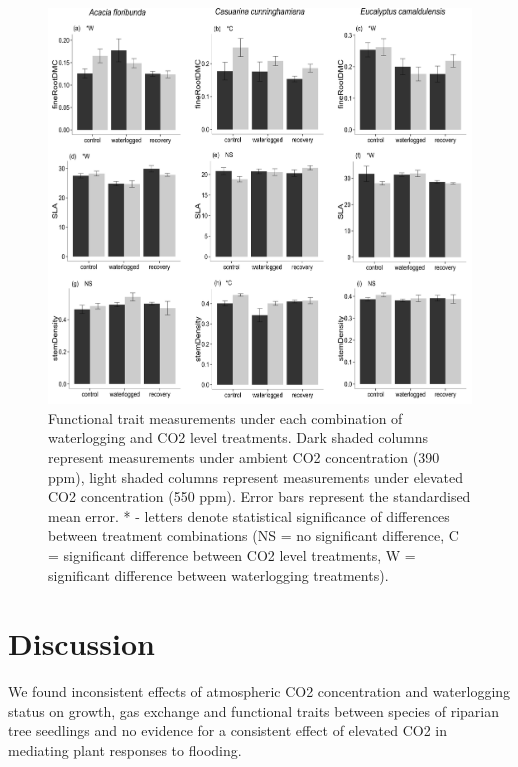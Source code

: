 \documentclass[12pt,a4paper]{memoir}
\begin{document}
\begin{figure}[h!t]
\begin{center}
\includegraphics[width=\linewidth,keepaspectratio=true]{traits2.png} %
\caption[Functional trait measurements under each combination of waterlogging and CO2 level treatments.]{\small{Functional trait measurements under each combination of waterlogging and CO2 level treatments. Dark shaded columns represent measurements under ambient CO2 concentration (390 ppm), light shaded columns represent measurements under elevated CO2 concentration (550 ppm). Error bars represent the standardised mean error. * - letters denote statistical significance of differences between treatment combinations (NS = no significant difference, C = significant difference between CO2 level treatments, W = significant difference between waterlogging treatments).}} %
\label{Ch5_F3} %
\end{center}
\end{figure}

\section{Discussion}
We found inconsistent effects of atmospheric CO2 concentration and waterlogging status on growth, gas exchange and functional traits between species of riparian tree seedlings and no evidence for a consistent effect of elevated CO2 in mediating plant responses to flooding. 
\end{document}

